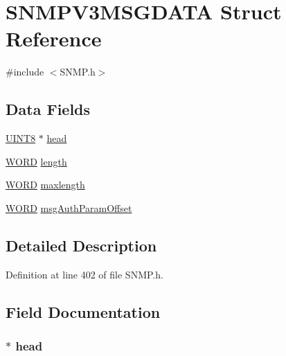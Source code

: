 \hypertarget{struct_s_n_m_p_v3_m_s_g_d_a_t_a}{}\section{S\+N\+M\+P\+V3\+M\+S\+G\+D\+A\+T\+A Struct Reference}
\label{struct_s_n_m_p_v3_m_s_g_d_a_t_a}


{\ttfamily \#include $<$S\+N\+M\+P.\+h$>$}

\subsection*{Data Fields}
\begin{DoxyCompactItemize}
\item 
\hyperlink{_generic_type_defs_8h_ab27e9918b538ce9d8ca692479b375b6a}{U\+I\+N\+T8} $\ast$ \hyperlink{struct_s_n_m_p_v3_m_s_g_d_a_t_a_a92ba995540023c41f980cdbc2b51c5ad}{head}
\item 
\hyperlink{_generic_type_defs_8h_a2b0e863dadf920709ec53d9088ee7c91}{W\+O\+R\+D} \hyperlink{struct_s_n_m_p_v3_m_s_g_d_a_t_a_ac03f72dfd2e32790101f1221796ea289}{length}
\item 
\hyperlink{_generic_type_defs_8h_a2b0e863dadf920709ec53d9088ee7c91}{W\+O\+R\+D} \hyperlink{struct_s_n_m_p_v3_m_s_g_d_a_t_a_a13701c90cc1e4dfdcadc17465ec5553f}{maxlength}
\item 
\hyperlink{_generic_type_defs_8h_a2b0e863dadf920709ec53d9088ee7c91}{W\+O\+R\+D} \hyperlink{struct_s_n_m_p_v3_m_s_g_d_a_t_a_a2ed79ec5619d12a3d9314b8b18f5b9be}{msg\+Auth\+Param\+Offset}
\end{DoxyCompactItemize}


\subsection{Detailed Description}


Definition at line 402 of file S\+N\+M\+P.\+h.



\subsection{Field Documentation}
\hypertarget{struct_s_n_m_p_v3_m_s_g_d_a_t_a_a92ba995540023c41f980cdbc2b51c5ad}{}
\subsubsection[{head}]{$\ast$ head}\label{struct_s_n_m_p_v3_m_s_g_d_a_t_a_a92ba995540023c41f980cdbc2b51c5ad}


